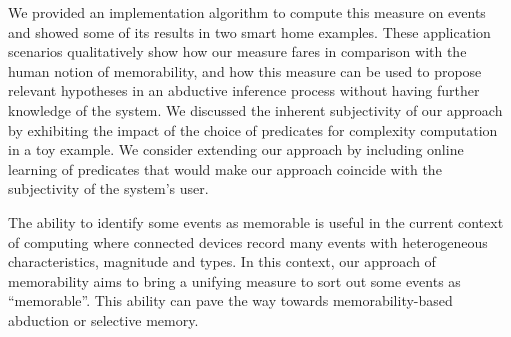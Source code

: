 \documentclass[entropy,article,submit,moreauthors,pdftex]{Definitions/mdpi}
\begin{document}
We provided an implementation algorithm to compute this measure on events and showed some of its results in two smart home examples. These application scenarios qualitatively show how our measure fares in comparison with the human notion of memorability, and how this measure can be used to propose relevant hypotheses in an abductive inference process without having further knowledge of the system. We discussed the inherent subjectivity of our approach by exhibiting the impact of the choice of predicates for complexity computation in a toy example. We consider extending our approach by including online learning of predicates that would make our approach coincide with the subjectivity of the system's user.

The ability to identify some events as memorable is useful in the current context of computing where connected devices record many events with heterogeneous characteristics, magnitude and types. In this context, our approach of memorability aims to bring a unifying measure to sort out some events as ``memorable''. This ability can pave the way towards memorability-based abduction or selective memory.


\vspace{6pt}






\end{document}
